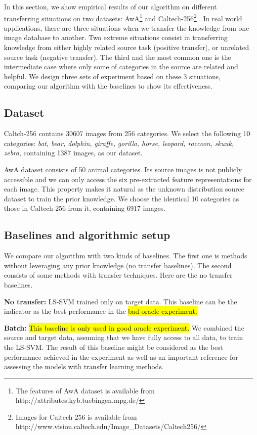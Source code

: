 In this section, we show empirical results of our algorithm on different transferring situations on two datasets: AwA\footnote{The features of AwA dataset is available from http://attributes.kyb.tuebingen.mpg.de/} \cite{lampert2009learning} and Caltech-256\footnote{Images for Caltech-256 is available from http://www.vision.caltech.edu/Image\_Datasets/Caltech256/} \cite{griffin2007caltech}. In real world applications, there are three situations when we transfer the knowledge from one image database to another. Two extreme situations consist in transferring knowledge from either highly related source task (positive transfer), or unrelated source task (negative transfer). The third and the most common one is the intermediate case where only some of categories in the source are related and helpful. We design three sets of experiment based on these 3 situations, comparing our algorithm with the baselines to show its effectiveness.
\subsection{Dataset}
Caltch-256 contains 30607 images from 256 categories. We select the following 10 categories: \textit{bat, bear, dolphin, giraffe, gorilla, horse, leopard, raccoon, skunk, zebra}, containing 1387 images, as our dataset.

AwA dataset consists of 50 animal categories. Its source images is not publicly accessible and we can only access the six pre-extracted feature representations for each image. This property makes it natural as the unknown distribution source dataset to train the prior knowledge. We choose the identical 10 categories as those in Caltech-256 from it, containing 6917 images.

\subsection{Baselines and algorithmic setup}
We compare our algorithm with two kinds of baselines. The first one is methods without leveraging any prior knowledge (no transfer baselines). The second consists of some methods with transfer techniques. Here are the no transfer baselines.

\textbf{No transfer:} LS-SVM trained only on target data. This baseline can be the indicator as the best performance in the \hl{bad oracle experiment.}

\textbf{Batch:} \hl{This baseline is only used in good oracle experiment.} We combined the source and target data, assuming that we have fully access to all data, to train the LS-SVM. The result of this baseline might be considered as the best performance achieved in the experiment as well as an important reference for assessing the models with transfer learning methods.

